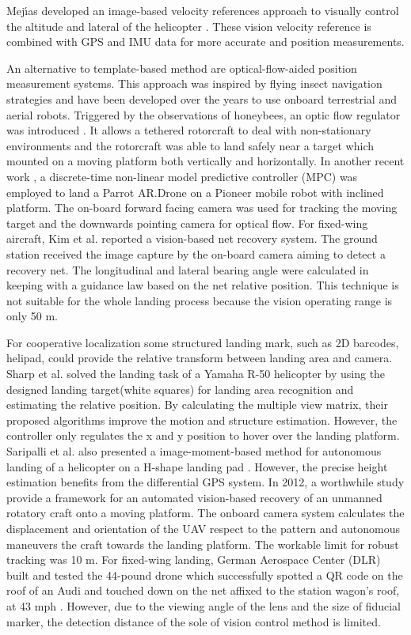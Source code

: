 Mej{\'{\i}}as developed an image-based velocity references approach to visually control the altitude and lateral of the helicopter \cite{Mejias2006}. These vision velocity reference is combined with GPS and IMU data for more accurate and position measurements.

An alternative to template-based method are optical-flow-aided position measurement systems. This approach was inspired by flying insect navigation strategies \cite{Green2004} and have been developed over the years to use onboard terrestrial and aerial robots. Triggered by the observations of honeybees, an optic flow regulator was introduced \cite{Ruffier2014}. It allows a tethered rotorcraft to deal with non-stationary environments and the rotorcraft was able to land safely near a target which mounted on a moving platform both vertically and horizontally. In another recent work \cite{Vlantis2015}, a discrete-time non-linear model predictive controller (MPC) was employed to land a Parrot AR.Drone on a Pioneer mobile robot with inclined platform. The on-board forward facing camera was used for tracking the moving target and the downwards pointing camera for optical flow. For fixed-wing aircraft, Kim et al.\cite{Kim2013} reported a vision-based net recovery system. The ground station received the image capture by the on-board camera aiming to detect a recovery net. The longitudinal and lateral bearing angle were calculated in keeping with a guidance law based on the net relative position. This technique is not suitable for the whole landing process because the vision operating range is only 50 m.
 


For cooperative localization some structured landing mark, such as 2D barcodes, helipad, could provide the relative transform between landing area and camera. Sharp et al. \cite{Sharp2001} solved the landing task of a Yamaha R-50 helicopter by using the designed landing target(white squares) for landing area recognition and estimating the relative position. By calculating the multiple view matrix, their proposed algorithms\cite{Shakernia2002} improve the motion and structure estimation. However, the controller only regulates the x and y position to hover over the landing platform. Saripalli et al. also presented a image-moment-based method for autonomous landing of a helicopter on a H-shape landing pad \cite{Saripalli2003}. However, the precise height estimation benefits from the differential GPS system. In 2012, a worthwhile study \cite{richardsonautomated2013} provide a framework for an automated vision-based recovery of an unmanned rotatory craft onto a moving platform. The onboard camera system calculates the displacement and orientation of the UAV respect to the pattern and autonomous maneuvers the craft towards the landing platform. The workable limit for robust tracking was 10 m. For fixed-wing landing, German Aerospace Center (DLR) built and tested the 44-pound drone which successfully spotted a QR code on the roof of an Audi and touched down on the net affixed to the station wagon’s roof, at 43 mph \cite{DLR_Landing}. However, due to the viewing angle of the lens and the size of fiducial marker, the detection distance of the sole of vision control method is limited.


